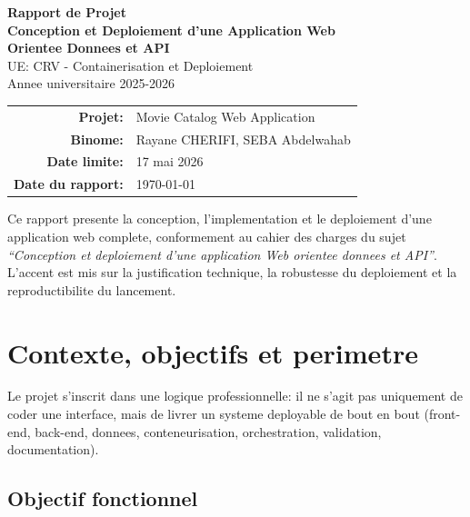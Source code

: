 \documentclass[11pt,a4paper]{article}
\begin{document}
\begin{titlepage}
  \centering
  {\Large \textbf{Rapport de Projet}}\\[0.4cm]
  {\LARGE \textbf{Conception et Deploiement d'une Application Web}}\\[0.2cm]
  {\LARGE \textbf{Orientee Donnees et API}}\\[1.2cm]

  {\large UE: CRV - Containerisation et Deploiement}\\[0.3cm]
  {\large Annee universitaire 2025-2026}\\[1.0cm]

  \begin{tabular}{rl}
    \textbf{Projet:} & Movie Catalog Web Application \\
    \textbf{Binome:} & Rayane CHERIFI, SEBA Abdelwahab \\
    \textbf{Date limite:} & 17 mai 2026 \\
    \textbf{Date du rapport:} & \today \\
  \end{tabular}

  \vfill

  \begin{minipage}{0.95\textwidth}
  \small
  Ce rapport presente la conception, l'implementation et le deploiement d'une application web complete,
  conformement au cahier des charges du sujet \textit{``Conception et deploiement d'une application Web orientee donnees et API''}.
  L'accent est mis sur la justification technique, la robustesse du deploiement et la reproductibilite du lancement.
  \end{minipage}
\end{titlepage}

\tableofcontents
\newpage

\section{Contexte, objectifs et perimetre}

Le projet s'inscrit dans une logique professionnelle: il ne s'agit pas uniquement de coder une interface,
mais de livrer un systeme deployable de bout en bout (front-end, back-end, donnees, conteneurisation, orchestration,
validation, documentation).

\subsection{Objectif fonctionnel}
\end{document}
